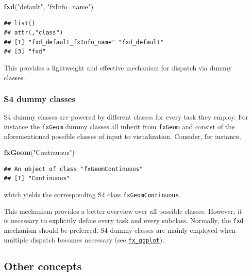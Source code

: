 \documentclass[]{report}
\newenvironment{Shaded}{\begin{snugshade}}{\end{snugshade}}
\newcommand{\KeywordTok}[1]{\textcolor[rgb]{0.13,0.29,0.53}{\textbf{#1}}}
\newcommand{\StringTok}[1]{\textcolor[rgb]{0.31,0.60,0.02}{#1}}
\newcommand{\NormalTok}[1]{#1}
\theoremstyle{definition}
\theoremstyle{definition}
\theoremstyle{definition}
\theoremstyle{remark}
\begin{document}
\begin{Shaded}
\begin{Highlighting}[]
\KeywordTok{fxd}\NormalTok{(}\StringTok{"default"}\NormalTok{, }\StringTok{"fxInfo_name"}\NormalTok{)}
\end{Highlighting}
\end{Shaded}

\begin{verbatim}
## list()
## attr(,"class")
## [1] "fxd_default_fxInfo_name" "fxd_default"            
## [3] "fxd"
\end{verbatim}

This provides a lightweight and effective mechanism for dispatch via
dummy classes.

\subsubsection{S4 dummy classes}\label{s4-dummy-classes}

S4 dummy classes are powered by different classes for every task they
employ. For instance the \texttt{fxGeom} dummy classes all inherit from
\texttt{fxGeom} and consist of the aforementioned possible classes of
input to visualization. Consider, for instance,

\begin{Shaded}
\begin{Highlighting}[]
\KeywordTok{fxGeom}\NormalTok{(}\StringTok{"Continuous"}\NormalTok{)}
\end{Highlighting}
\end{Shaded}

\begin{verbatim}
## An object of class "fxGeomContinuous"
## [1] "Continuous"
\end{verbatim}

which yields the corresponding S4 class \texttt{fxGeomContinuous}.

This mechanism provides a better overview over all possible classes.
However, it is necessary to explicitly define every task and every
subclass. Normally, the \texttt{fxd} mechanism should be preferred. S4
dummy classes are mainly employed when multiple dispatch becomes
necessary (see \protect\hyperlink{fx_ggplot}{\texttt{fx\_ggplot}}).

\subsection{Other concepts}\label{other-concepts}
\end{document}
